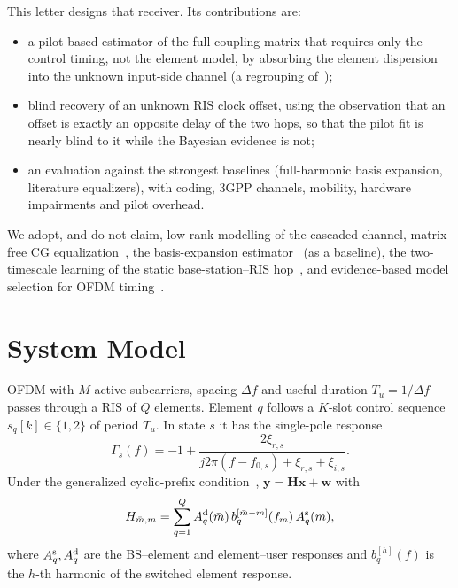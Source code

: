 \documentclass[journal]{IEEEtran}
\begin{document}
This letter designs that receiver. Its contributions are:
\begin{itemize}
\item a pilot-based estimator of the full coupling matrix that requires only the
control timing, not the element model, by absorbing the element dispersion
into the unknown input-side channel (a regrouping of~\cite[eq.~(5)]{iudice2026});
\item blind recovery of an unknown RIS clock offset, using the observation that
an offset is exactly an opposite delay of the two hops, so that the pilot fit is
nearly blind to it while the Bayesian evidence is not;
\item an evaluation against the strongest baselines (full-harmonic basis
expansion, literature equalizers), with coding, 3GPP channels, mobility,
hardware impairments and pilot overhead.
\end{itemize}
We adopt, and do not claim, low-rank modelling of the cascaded channel,
matrix-free CG equalization~\cite{hrycak2010}, the basis-expansion
estimator~\cite{tang2007} (as a baseline), the two-timescale learning of the
static base-station--RIS hop~\cite{hu2019twotimescale}, and evidence-based model
selection for OFDM timing~\cite{access2019bayes}.

\section{System Model}
OFDM with $M$ active subcarriers, spacing $\Delta f$ and useful duration
$T_u=1/\Delta f$ passes through a RIS of $Q$ elements. Element $q$ follows a
$K$-slot control sequence $s_q[k]\in\{1,2\}$ of period $T_u$. In state $s$ it has
the single-pole response~\cite{iudice2026}
\begin{equation}
\Gamma_s(f) = -1 + \frac{2\xi_{r,s}}{j2\pi(f-f_{0,s})+\xi_{r,s}+\xi_{i,s}} .
\end{equation}
Under the generalized cyclic-prefix condition~\cite{iudice2026}, $\bm y=\bm H\bm x+\bm w$ with
\begin{equation}
H_{\bar m,m}=\sum_{q=1}^{Q} A^{\rm d}_{q}(\bar m)\, b_q^{[\bar m-m]}(f_m)\, A^{\rm s}_{q}(m),
\label{eq:H}
\end{equation}
where $A^{\rm s}_q,A^{\rm d}_q$ are the BS--element and element--user responses and
$b_q^{[h]}(f)$ is the $h$-th harmonic of the switched element response.
\end{document}
